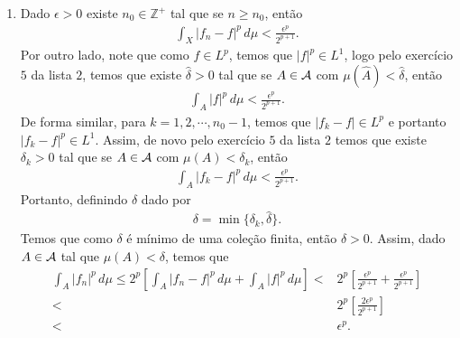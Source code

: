 \begin{homeworkProblem}[4]
\begin{solution}
\begin{enumerate}
      \begin{align*}
        A=\hat{A}\cup \bigcup_{k=1}^{n_0-1}A_k.
      \end{align*}
      Temos que como $A$ é união finita de conjuntos de medida finita, então  $\mu(A)<+\infty$. Logo, se $B\cap A=\emptyset$, então $B\subseteq X\setminus A$ e portanto
      \begin{align*}
        \int_{B}|f_n|^{p}\,d\mu\leq \int_{X\setminus A}|f_n|^{p}\,d\mu\leq& 2^{p}\left[ \int_{X\setminus A}|f_n-f|^{p}\,d\mu + \int_{X\setminus A}|f|^{p}\,d\mu \right]\\
        <& 2^{p}\left[ \frac{\epsilon^{p}}{2^{p+1}}+\frac{\epsilon^{p}}{2^{p+1}} \right]\\
        <& 2^{p}\left[ \frac{2\epsilon^{p}}{2^{p+1}} \right]\\
        <& \epsilon^{p}.
      \end{align*}
    \item Dado $\epsilon>0$ existe $n_0\in\mathbb{Z}^{+}$ tal que se $n\geq n_0$, então
      \begin{align*}
        \int_{X}|f_n-f|^{p}\,d\mu<\frac{\epsilon^{p}}{2^{p+1}}.
      \end{align*}
      Por outro lado, note que como $f\in L^{p}$, temos que $|f|^{p}\in L^{1}$, logo pelo exercício $5$ da lista $2$, temos que existe $\hat{\delta}>0$ tal que se $A\in\mathcal{A}$ com $\mu(\hat{A})<\hat{\delta}$, então
      \begin{align*}
        \int_{A}|f|^{p}\,d\mu< \frac{\epsilon^{p}}{2^{p+1}}.
      \end{align*}
      De forma similar, para $k=1,2,\cdots,n_0-1$, temos que $|f_k-f|\in L^{p}$ e portanto $|f_k-f|^{p}\in L^{1}$. Assim, de novo pelo exercício $5$ da lista $2$ temos que existe $\delta_k>0$ tal que se $A\in\mathcal{A}$ com $\mu(A)<\delta_k$, então
      \begin{align*}
        \int_{A}|f_k-f|^{p}\,d\mu < \frac{\epsilon^{p}}{2^{p+1}}. 
      \end{align*}
      Portanto, definindo $\delta$ dado por
      \begin{align*}
        \delta=\min\{\delta_k,\hat{\delta}\}.
      \end{align*}
      Temos que como $\delta$ é mínimo de uma coleção finita, então $\delta>0$. Assim, dado $A\in\mathcal{A}$ tal que $\mu(A)<\delta$, temos que
      \begin{align*}
        \int_{A}|f_n|^{p}\,d\mu\leq 2^{p}\left[ \int_{A}|f_n-f|^{p}\,d\mu + \int_{A}|f|^{p}\,d\mu \right]<& 2^{p}\left[ \frac{\epsilon^{p}}{2^{p+1}}+\frac{\epsilon^{p}}{2^{p+1}} \right]\\
        <& 2^{p}\left[ \frac{2\epsilon^{p}}{2^{p+1}} \right]\\
        <& \epsilon^{p}.
      \end{align*}
  \end{enumerate} 
  \end{solution}
\end{homeworkProblem}
